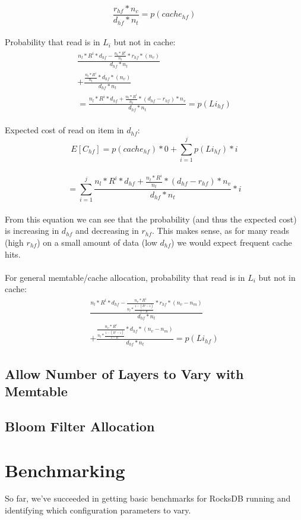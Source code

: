 \documentclass{sig-alternate-05-2015}
\begin{document}
$$\frac{r_{hf} * n_c}{d_{hf} * n_t} = p(cache_{hf})$$ \\
Probability that read is in $L_i$ but not in cache: 
\begin{multline}
\frac{n_l * R^{i}*d_{hf} - \frac{n_l * R^{i}}{n_t} * r_{hf} * (n_v)}{d_{hf} * n_t} \\+ \frac{\frac{n_l * R^{i}}{n_t} *d_{hf} *(n_v)}{d_{hf} * n_t}  \\= \frac{n_l * R^{i}*d_{hf}+ \frac{n_l * R^{i}}{n_t} * (d_{hf}-r_{hf})* n_v}{d_{hf} * n_t} = p(Li_{hf}) 
\end{multline} \\
Expected cost of read on item in $d_{hf}$: \\
$$E[C_{hf}]= p(cache_{hf}) * 0 + \sum_{i=1}^j p(Li_{hf}) * i$$\\
$$
= \sum_{i=1}^j \frac{n_l * R^{i}*d_{hf}+ \frac{n_l * R^{i}}{n_t} * (d_{hf}-r_{hf})* n_v}{d_{hf} * n_t}  * i
$$ \\
From this equation we can see that the probability (and thus the expected cost) is increasing in $d_{hf}$ and decreasing in $r_{hf}$. This makes sense, as for many reads (high $r_{hf}$) on a small amount of data (low $d_{hf}$) we would expect frequent cache hits. \\ \\
For general memtable/cache allocation, probability that read is in $L_i$ but not in cache: 
\begin{multline}
\frac{n_l * R^{i}*d_{hf} - \frac{n_v * R^{i}}{n_l * \frac{1-(R^j-1)}{1-R}} * r_{hf} * (n_v - n_m)}{d_{hf} * n_t} \\+ \frac{\frac{n_v * R^{i}}{n_l * \frac{1-(R^j-1)}{1-R}} *d_{hf} *(n_v - n_m)}{d_{hf} * n_t}  = p(Li_{hf})
\end{multline}
\subsection{Allow Number of Layers to Vary with Memtable}
\subsection{Bloom Filter Allocation}

\section{Benchmarking}

So far, we've succeeded in getting basic benchmarks for RocksDB running and
identifying which configuration parameters to vary.
\end{document}
